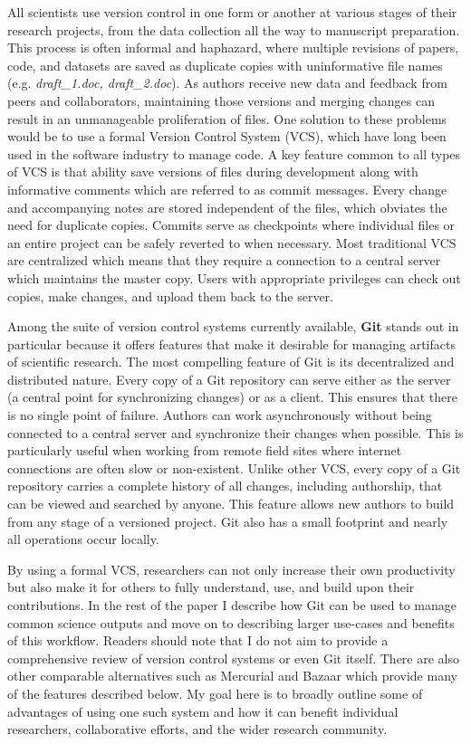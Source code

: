 \documentclass[]{article}
\begin{document}
All scientists use version control in one form or another at various
stages of their research projects, from the data collection all the way
to manuscript preparation. This process is often informal and haphazard,
where multiple revisions of papers, code, and datasets are saved as
duplicate copies with uninformative file names (e.g. \emph{draft\_1.doc,
draft\_2.doc}). As authors receive new data and feedback from peers and
collaborators, maintaining those versions and merging changes can result
in an unmanageable proliferation of files. One solution to these
problems would be to use a formal Version Control System (VCS), which
have long been used in the software industry to manage code. A key
feature common to all types of VCS is that ability save versions of
files during development along with informative comments which are
referred to as commit messages. Every change and accompanying notes are
stored independent of the files, which obviates the need for duplicate
copies. Commits serve as checkpoints where individual files or an entire
project can be safely reverted to when necessary. Most traditional VCS
are centralized which means that they require a connection to a central
server which maintains the master copy. Users with appropriate
privileges can check out copies, make changes, and upload them back to
the server.

Among the suite of version control systems currently available,
\textbf{Git} stands out in particular because it offers features that
make it desirable for managing artifacts of scientific research. The
most compelling feature of Git is its decentralized and distributed
nature. Every copy of a Git repository can serve either as the server (a
central point for synchronizing changes) or as a client. This ensures
that there is no single point of failure. Authors can work
asynchronously without being connected to a central server and
synchronize their changes when possible. This is particularly useful
when working from remote field sites where internet connections are
often slow or non-existent. Unlike other VCS, every copy of a Git
repository carries a complete history of all changes, including
authorship, that can be viewed and searched by anyone. This feature
allows new authors to build from any stage of a versioned project. Git
also has a small footprint and nearly all operations occur locally.

By using a formal VCS, researchers can not only increase their own
productivity but also make it for others to fully understand, use, and
build upon their contributions. In the rest of the paper I describe how
Git can be used to manage common science outputs and move on to
describing larger use-cases and benefits of this workflow. Readers
should note that I do not aim to provide a comprehensive review of
version control systems or even Git itself. There are also other
comparable alternatives such as Mercurial and Bazaar which provide many
of the features described below. My goal here is to broadly outline some
of advantages of using one such system and how it can benefit individual
researchers, collaborative efforts, and the wider research community.
\end{document}

